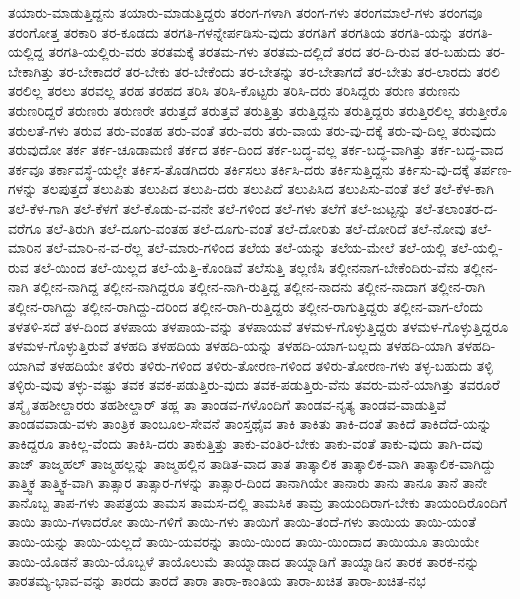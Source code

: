 {ತಯಾರು-ಮಾಡುತ್ತಿದ್ದನು
ತಯಾರು-ಮಾಡುತ್ತಿದ್ದರು
ತರಂಗ-ಗಳಾಗಿ
ತರಂಗ-ಗಳು
ತರಂಗಮಾಲೆ-ಗಳು
ತರಂಗವೂ
ತರಂಗೋತ್ತ
ತರಕಾರಿ
ತರ-ಕೂಡದು
ತರಗತಿ-ಗಳನ್ನೇರ್ಪಡಿಸು-ವುದು
ತರಗತಿಗೆ
ತರಗತಿಯ
ತರಗತಿ-ಯನ್ನು
ತರಗತಿ-ಯಲ್ಲಿದ್ದ
ತರಗತಿ-ಯಲ್ಲಿರು-ವರು
ತರತಮಕ್ಕೆ
ತರತಮ-ಗಳು
ತರತಮ-ದಲ್ಲಿದೆ
ತರದ
ತರ-ದಿ-ರುವ
ತರ-ಬಹುದು
ತರ-ಬೇಕಾಗಿತ್ತು
ತರ-ಬೇಕಾದರೆ
ತರ-ಬೇಕು
ತರ-ಬೇಕೆಂದು
ತರ-ಬೇತನ್ನು
ತರ-ಬೇತಾಗದೆ
ತರ-ಬೇತು
ತರ-ಲಾರದು
ತರಲಿ
ತರಲಿಲ್ಲ
ತರಲು
ತರವಲ್ಲ
ತರಹ
ತರಹದ
ತರಿಸಿ
ತರಿಸಿ-ಕೊಟ್ಟರು
ತರಿಸಿ-ದರು
ತರಿಸಿದ್ದರು
ತರುಣ
ತರುಣನು
ತರುಣರಿದ್ದರೆ
ತರುಣರು
ತರುಣರೇ
ತರುತ್ತದೆ
ತರುತ್ತವೆ
ತರುತ್ತಿತ್ತು
ತರುತ್ತಿದ್ದನು
ತರುತ್ತಿದ್ದರು
ತರುತ್ತಿರಲಿಲ್ಲ
ತರುತ್ತೀರೊ
ತರುಲತೆ-ಗಳು
ತರುವ
ತರು-ವಂತಹ
ತರು-ವಂತೆ
ತರು-ವರು
ತರು-ವಾಯ
ತರು-ವು-ದಕ್ಕೆ
ತರು-ವು-ದಿಲ್ಲ
ತರುವುದು
ತರುವುದೋ
ತರ್ಕ
ತರ್ಕ-ಚೂಡಾಮಣಿ
ತರ್ಕದ
ತರ್ಕ-ದಿಂದ
ತರ್ಕ-ಬದ್ಧ-ವಲ್ಲ
ತರ್ಕ-ಬದ್ಧ-ವಾಗಿತ್ತು
ತರ್ಕ-ಬದ್ಧ-ವಾದ
ತರ್ಕವೂ
ತರ್ಕಾವಸ್ಥೆ-ಯಲ್ಲೇ
ತರ್ಕಿಸ-ತೊಡಗಿದರು
ತರ್ಕಿಸಲು
ತರ್ಕಿಸಿ-ದರು
ತರ್ಕಿಸುತ್ತಿದ್ದನು
ತರ್ಕಿಸು-ವು-ದಕ್ಕೆ
ತರ್ಪಣ-ಗಳನ್ನು
ತಲಪುತ್ತದೆ
ತಲುಪಿತು
ತಲುಪಿದ
ತಲುಪಿ-ದರು
ತಲುಪಿದೆ
ತಲುಪಿಸಿದ
ತಲುಪಿಸು-ವಂತೆ
ತಲೆ
ತಲೆ-ಕೆಳ-ಕಾಗಿ
ತಲೆ-ಕೆಳ-ಗಾಗಿ
ತಲೆ-ಕೆಳಗೆ
ತಲೆ-ಕೊಡು-ವ-ವನೇ
ತಲೆ-ಗಳಿಂದ
ತಲೆ-ಗಳು
ತಲೆಗೆ
ತಲೆ-ಜುಟ್ಟನ್ನು
ತಲೆ-ತಲಾಂತರ-ದ-ವರೆಗೂ
ತಲೆ-ತಿರುಗಿ
ತಲೆ-ದೂಗು-ವಂತಹ
ತಲೆ-ದೂಗು-ವಂತೆ
ತಲೆ-ದೋರಿತು
ತಲೆ-ದೋರಿದೆ
ತಲೆ-ನೋವು
ತಲೆ-ಮಾರಿನ
ತಲೆ-ಮಾರಿ-ನ-ವ-ರೆಲ್ಲ
ತಲೆ-ಮಾರು-ಗಳಿಂದ
ತಲೆಯ
ತಲೆ-ಯನ್ನು
ತಲೆಯ-ಮೇಲೆ
ತಲೆ-ಯಲ್ಲಿ
ತಲೆ-ಯಲ್ಲಿ-ರುವ
ತಲೆ-ಯಿಂದ
ತಲೆ-ಯಿಲ್ಲದ
ತಲೆ-ಯೆತ್ತಿ-ಕೊಂಡಿವೆ
ತಲೆಸುತ್ತಿ
ತಲ್ಲಣಿಸಿ
ತಲ್ಲೀನನಾಗ-ಬೇಕೆಂದಿರು-ವೆನು
ತಲ್ಲೀನ-ನಾಗಿ
ತಲ್ಲೀನ-ನಾಗಿದ್ದ
ತಲ್ಲೀನ-ನಾಗಿದ್ದರೂ
ತಲ್ಲೀನ-ನಾಗಿ-ರುತ್ತಿದ್ದ
ತಲ್ಲೀನ-ನಾದನು
ತಲ್ಲೀನ-ನಾದಾಗ
ತಲ್ಲೀನ-ರಾಗಿ
ತಲ್ಲೀನ-ರಾಗಿದ್ದು
ತಲ್ಲೀನ-ರಾಗಿದ್ದು-ದರಿಂದ
ತಲ್ಲೀನ-ರಾಗಿ-ರುತ್ತಿದ್ದರು
ತಲ್ಲೀನ-ರಾಗುತ್ತಿದ್ದರು
ತಲ್ಲೀನ-ವಾಗ-ಲೆಂದು
ತಳತಳಿ-ಸದೆ
ತಳ-ದಿಂದ
ತಳಪಾಯ
ತಳಪಾಯ-ವನ್ನು
ತಳಪಾಯವೆ
ತಳಮಳ-ಗೊಳ್ಳುತ್ತಿದ್ದರು
ತಳಮಳ-ಗೊಳ್ಳುತ್ತಿದ್ದರೂ
ತಳಮಳ-ಗೊಳ್ಳುತ್ತಿರುವೆ
ತಳಹದಿ
ತಳಹದಿಯ
ತಳಹದಿ-ಯನ್ನು
ತಳಹದಿ-ಯಾಗ-ಬಲ್ಲದು
ತಳಹದಿ-ಯಾಗಿ
ತಳಹದಿ-ಯಾಗಿವೆ
ತಳಹದಿಯೇ
ತಳಿರು
ತಳಿರು-ಗಳಿಂದ
ತಳಿರು-ತೋರಣ-ಗಳಿಂದ
ತಳಿರು-ತೋರಣ-ಗಳು
ತಳ್ಳ-ಬಹುದು
ತಳ್ಳಿ
ತಳ್ಳಿರು-ವುವು
ತಳ್ಳು-ವಷ್ಟು
ತವಕ
ತವಕ-ಪಡುತ್ತಿರು-ವುದು
ತವಕ-ಪಡುತ್ತಿರು-ವೆನು
ತವರು-ಮನೆ-ಯಾಗಿತ್ತು
ತವರೂರೆ
ತಸ್ಮೈ
ತಹಶೀಲ್ದಾರರು
ತಹಶೀಲ್ದಾರ್
ತಹ್ಲ
ತಾ
ತಾಂಡವ-ಗಳೊಂದಿಗೆ
ತಾಂಡವ-ನೃತ್ಯ
ತಾಂಡವ-ವಾಡುತ್ತಿವೆ
ತಾಂಡವವಾಡು-ವಳು
ತಾಂತ್ರಿಕ
ತಾಂಬೂಲ-ಸೇವನೆ
ತಾಂಸ್ತಥೈವ
ತಾಕಿ
ತಾಕಿತು
ತಾಕಿ-ದಂತೆ
ತಾಕಿದೆ
ತಾಕಿದೆದೆ-ಯನ್ನು
ತಾಕಿದ್ದರೂ
ತಾಕಿಲ್ಲ-ವೆಂದು
ತಾಕಿಸಿ-ದರು
ತಾಕುತ್ತಿತ್ತು
ತಾಕು-ವಂತಿರ-ಬೇಕು
ತಾಕು-ವಂತೆ
ತಾಕು-ವುದು
ತಾಗಿ-ದವು
ತಾಜ್
ತಾಜ್ಮಹಲ್
ತಾಜ್ಮಹಲ್ಲನ್ನು
ತಾಜ್ಮಹಲ್ಲಿನ
ತಾಡಿತ-ವಾದ
ತಾತ
ತಾತ್ಕಾಲಿಕ
ತಾತ್ಕಾಲಿಕ-ವಾಗಿ
ತಾತ್ಕಾಲಿಕ-ವಾಗಿದ್ದು
ತಾತ್ತ್ವಿಕ
ತಾತ್ತ್ವಿಕ-ವಾಗಿ
ತಾತ್ಸಾರ
ತಾತ್ಸಾರ-ಗಳನ್ನು
ತಾತ್ಸಾರ-ದಿಂದ
ತಾನಾಗಿಯೇ
ತಾನಾರು
ತಾನು
ತಾನೂ
ತಾನೆ
ತಾನೇ
ತಾನೊಬ್ಬ
ತಾಪ-ಗಳು
ತಾಪತ್ರಯ
ತಾಮಸ
ತಾಮಸ-ದಲ್ಲಿ
ತಾಮಸಿಕ
ತಾಮ್ರ
ತಾಯಂದಿರಾಗ-ಬೇಕು
ತಾಯಂದಿರೊಂದಿಗೆ
ತಾಯಿ
ತಾಯಿ-ಗಳಾದರೋ
ತಾಯಿ-ಗಳಿಗೆ
ತಾಯಿ-ಗಳು
ತಾಯಿಗೆ
ತಾಯಿ-ತಂದೆ-ಗಳು
ತಾಯಿಯ
ತಾಯಿ-ಯಂತೆ
ತಾಯಿ-ಯನ್ನು
ತಾಯಿ-ಯಲ್ಲದೆ
ತಾಯಿ-ಯವರನ್ನು
ತಾಯಿ-ಯಿಂದ
ತಾಯಿ-ಯಿಂದಾದ
ತಾಯಿಯೂ
ತಾಯಿಯೇ
ತಾಯಿ-ಯೊಡನೆ
ತಾಯಿ-ಯೊಬ್ಬಳೆ
ತಾಯೊಲುಮೆ
ತಾಯ್ನಾಡಾದ
ತಾಯ್ನಾಡಿಗೆ
ತಾಯ್ನಾಡಿನ
ತಾರಕ
ತಾರಕ-ನನ್ನು
ತಾರತಮ್ಯ-ಭಾವ-ವನ್ನು
ತಾರದು
ತಾರದೆ
ತಾರಾ
ತಾರಾ-ಕಾಂತಿಯ
ತಾರಾ-ಖಚಿತ
ತಾರಾ-ಖಚಿತ-ನಭ
}
